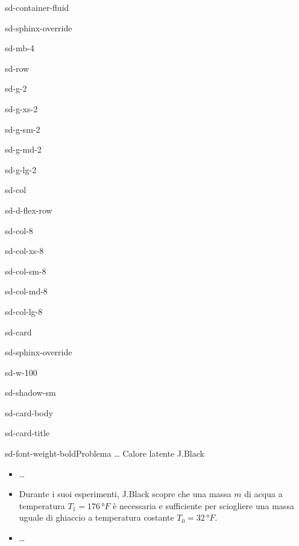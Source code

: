 \documentclass[letterpaper,10pt,italian]{jupyterBook}
\begin{document}
\begin{sphinxuseclass}{sd-container-fluid}
\begin{sphinxuseclass}{sd-sphinx-override}
\begin{sphinxuseclass}{sd-mb-4}
\begin{sphinxuseclass}{sd-row}
\begin{sphinxuseclass}{sd-g-2}
\begin{sphinxuseclass}{sd-g-xs-2}
\begin{sphinxuseclass}{sd-g-sm-2}
\begin{sphinxuseclass}{sd-g-md-2}
\begin{sphinxuseclass}{sd-g-lg-2}
\begin{sphinxuseclass}{sd-col}
\begin{sphinxuseclass}{sd-d-flex-row}
\begin{sphinxuseclass}{sd-col-8}
\begin{sphinxuseclass}{sd-col-xs-8}
\begin{sphinxuseclass}{sd-col-sm-8}
\begin{sphinxuseclass}{sd-col-md-8}
\begin{sphinxuseclass}{sd-col-lg-8}
\begin{sphinxuseclass}{sd-card}
\begin{sphinxuseclass}{sd-sphinx-override}
\begin{sphinxuseclass}{sd-w-100}
\begin{sphinxuseclass}{sd-shadow-sm}
\begin{sphinxuseclass}{sd-card-body}
\begin{sphinxuseclass}{sd-card-title}
\begin{sphinxuseclass}{sd-font-weight-bold}Problema … Calore latente \sphinxhyphen{} J.Black 
\end{sphinxuseclass}
\end{sphinxuseclass}\begin{itemize}
\item {} 
\sphinxAtStartPar
…

\item {} 
\sphinxAtStartPar
Durante i suoi esperimenti, J.Black scopre che una massa \(m\) di acqua a temperatura \(T_1 = 176 \, °F\) è necessaria e sufficiente per sciogliere una massa uguale di ghiaccio a temperatura costante \(T_0 = 32 \, °F\).

\item {} 
\sphinxAtStartPar
…


\end{itemize}
\end{sphinxuseclass}
\end{sphinxuseclass}
\end{sphinxuseclass}
\end{sphinxuseclass}
\end{sphinxuseclass}
\end{sphinxuseclass}
\end{sphinxuseclass}
\end{sphinxuseclass}
\end{sphinxuseclass}
\end{sphinxuseclass}
\end{sphinxuseclass}
\end{sphinxuseclass}
\end{sphinxuseclass}
\end{sphinxuseclass}
\end{sphinxuseclass}
\end{sphinxuseclass}
\end{sphinxuseclass}
\end{sphinxuseclass}
\end{sphinxuseclass}
\end{sphinxuseclass}
\end{sphinxuseclass}
\end{document}
